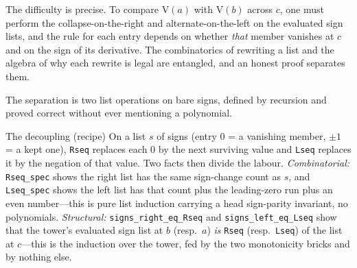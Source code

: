 \documentclass[11pt]{article}
\newcommand{\lean}[1]{\texttt{#1}}
\newcommand{\V}{\mathrm{V}}
\begin{document}
The difficulty is precise. To compare $\V(a)$ with $\V(b)$ across $c$, one must perform the
collapse-on-the-right and alternate-on-the-left on the evaluated sign lists, and the rule for each
entry depends on whether \emph{that} member vanishes at $c$ and on the sign of its derivative.
The combinatorics of rewriting a list and the algebra of why each rewrite is legal are entangled, and
an honest proof separates them.

The separation is two list operations on bare signs, defined by recursion and proved correct without
ever mentioning a polynomial.
\begin{recipebox}{The decoupling (recipe)}
On a list $s$ of signs (entry $0$ = a vanishing member, $\pm1$ = a kept one), \lean{Rseq} replaces
each $0$ by the next surviving value and \lean{Lseq} replaces it by the negation of that value.
Two facts then divide the labour. \emph{Combinatorial:} \lean{Rseq\_spec} shows the right list has the
same sign-change count as $s$, and \lean{Lseq\_spec} shows the left list has that count plus the
leading-zero run plus an even number---this is pure list induction carrying a head sign-parity
invariant, no polynomials. \emph{Structural:} \lean{signs\_right\_eq\_Rseq} and
\lean{signs\_left\_eq\_Lseq} show that the tower's evaluated sign list at $b$ (resp.\ $a$) \emph{is}
\lean{Rseq} (resp.\ \lean{Lseq}) of the list at $c$---this is the induction over the tower, fed by the
two monotonicity bricks and by nothing else.
\end{recipebox}
\end{document}

